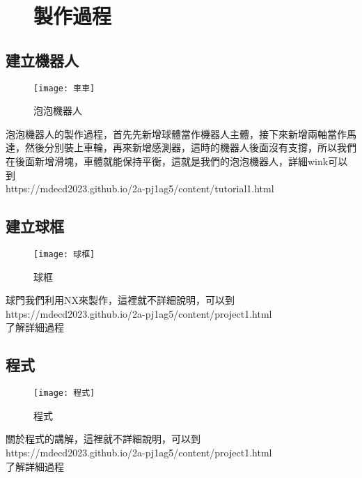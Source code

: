 \begin{figure}[hbt!]
\chapter{製作過程}
\end{figure}
\section{建立機器人}
\begin{figure}[hbt!]
\begin{center}
\texttt{[image: 車車]}
\caption{\Large 泡泡機器人}\label{泡泡機器人}
\end{center}
\end{figure}
\fontsize{14pt}{2.5pt}\sectionef
泡泡機器人的製作過程，首先先新增球體當作機器人主體，接下來新增兩軸當作馬達，然後分別裝上車輪，再來新增感測器，這時的機器人後面沒有支撐，所以我們在後面新增滑塊，車體就能保持平衡，這就是我們的泡泡機器人，詳細wink可以到\\
https://mdecd2023.github.io/2a-pj1ag5/content/tutorial1.html \\
\newpage
\section{建立球框}
\begin{figure}[hbt!]
\begin{center}
\texttt{[image: 球框]}
\caption{\Large 球框}\label{球框}
\end{center}
\end{figure}
球門我們利用NX來製作，這裡就不詳細說明，可以到\\
https://mdecd2023.github.io/2a-pj1ag5/content/project1.html\\
了解詳細過程 \\
\newpage
\section{程式}
\begin{figure}[hbt!]
\begin{center}
\texttt{[image: 程式]}
\caption{\Large 程式}\label{程式}
\end{center}
\end{figure}
關於程式的講解，這裡就不詳細說明，可以到\\
https://mdecd2023.github.io/2a-pj1ag5/content/project1.html\\
了解詳細過程 \\
\newpage
